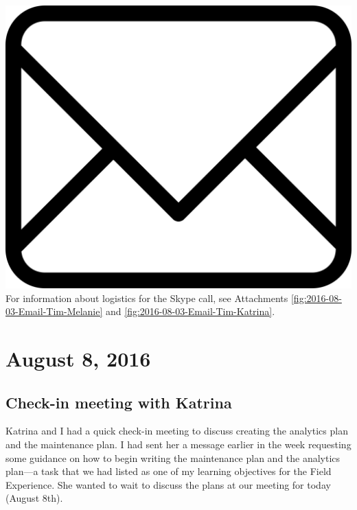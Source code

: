 \documentclass{article}
\begin{document}
\vspace{2em}
\noindent\includegraphics[height=\fontcharht\font`\B]{icons/attachment-email} For information about logistics for the Skype call, see Attachments \ref{fig:2016-08-03-Email-Tim-Melanie} and \ref{fig:2016-08-03-Email-Tim-Katrina}.
\vspace{2em}

\section{August 8, 2016}\label{2016-08-08}
\subsection{Check-in meeting with Katrina}
Katrina and I had a quick check-in meeting to discuss creating the analytics plan and the maintenance plan. I had sent her a message earlier in the week requesting some guidance on how to begin writing the maintenance plan and the analytics plan---a task that we had listed as one of my learning objectives for the Field Experience. She wanted to wait to discuss the plans at our meeting for today (August 8th).
\end{document}
